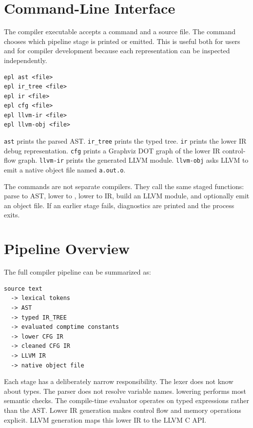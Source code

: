 \section{Command-Line Interface}

The compiler executable accepts a command and a source file. The command chooses
which pipeline stage is printed or emitted. This is useful both for users and for
compiler development because each representation can be inspected independently.

\begin{lstlisting}[caption={Compiler command-line modes}]
epl ast <file>
epl ir_tree <file>
epl ir <file>
epl cfg <file>
epl llvm-ir <file>
epl llvm-obj <file>
\end{lstlisting}

\texttt{ast} prints the parsed AST. \texttt{ir\_tree} prints the typed tree.
\texttt{ir} prints the lower IR debug representation. \texttt{cfg} prints a
Graphviz DOT graph of the lower IR control-flow graph. \texttt{llvm-ir} prints
the generated LLVM module. \texttt{llvm-obj} asks LLVM to emit a native object
file named \texttt{a.out.o}.

The commands are not separate compilers. They call the same staged functions:
parse to AST, lower to \irtree{}, lower to IR, build an LLVM module, and
optionally emit an object file. If an earlier stage fails, diagnostics are
printed and the process exits.

\section{Pipeline Overview}

The full compiler pipeline can be summarized as:

\begin{lstlisting}[caption={Compiler pipeline}]
source text
  -> lexical tokens
  -> AST
  -> typed IR_TREE
  -> evaluated comptime constants
  -> lower CFG IR
  -> cleaned CFG IR
  -> LLVM IR
  -> native object file
\end{lstlisting}

Each stage has a deliberately narrow responsibility. The lexer does not know
about types. The parser does not resolve variable names. \irtree{} lowering
performs most semantic checks. The compile-time evaluator operates on typed
\irtree{} expressions rather than the AST. Lower IR generation makes control
flow and memory operations explicit. LLVM generation maps this lower IR to the
LLVM C API.

